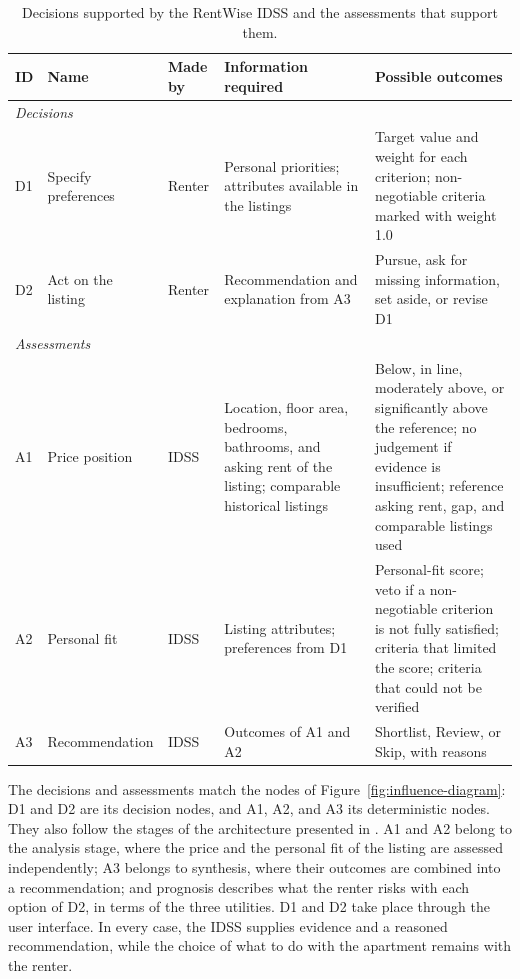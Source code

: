 \documentclass[12pt,a4paper]{report}
\begin{document}
\begin{table}[H]
\centering
\small
\caption{Decisions supported by the RentWise IDSS and the assessments that support them.}
\label{tab:decisions}
\begin{tabularx}{\textwidth}{p{0.6cm} p{2.8cm} p{1.8cm} X X}
\toprule
\textbf{ID} & \textbf{Name} & \textbf{Made by} &
\textbf{Information required} & \textbf{Possible outcomes}\\
\midrule
\multicolumn{5}{l}{\emph{Decisions}}\\
\addlinespace
D1 & Specify preferences & Renter &
Personal priorities; attributes available in the listings &
Target value and weight for each criterion; non-negotiable criteria marked
with weight 1.0\\
\addlinespace
D2 & Act on the listing & Renter &
Recommendation and explanation from A3 &
Pursue, ask for missing information, set aside, or revise D1\\
\midrule
\multicolumn{5}{l}{\emph{Assessments}}\\
\addlinespace
A1 & Price position & IDSS &
Location, floor area, bedrooms, bathrooms, and asking rent of the listing;
comparable historical listings &
Below, in line, moderately above, or significantly above the reference; no
judgement if evidence is insufficient; reference asking rent, gap, and
comparable listings used\\
\addlinespace
A2 & Personal fit & IDSS &
Listing attributes; preferences from D1 &
Personal-fit score; veto if a non-negotiable criterion is not fully
satisfied; criteria that limited the score; criteria that could not be
verified\\
\addlinespace
A3 & Recommendation & IDSS &
Outcomes of A1 and A2 &
Shortlist, Review, or Skip, with reasons\\
\bottomrule
\end{tabularx}
\end{table}

The decisions and assessments match the nodes of
Figure~\ref{fig:influence-diagram}: D1 and D2 are its decision nodes, and
A1, A2, and A3 its deterministic nodes. They also follow the stages of the
architecture presented in . A1 and A2 belong to the
analysis stage, where the price and the personal fit of the listing are
assessed independently; A3 belongs to synthesis, where their outcomes are
combined into a recommendation; and
prognosis describes what the renter risks with each option of D2, in terms
of the three utilities. D1 and D2 take place through the user interface.
In every case, the IDSS supplies evidence and a reasoned recommendation,
while the choice of what to do with the apartment remains with the renter.
\end{document}
